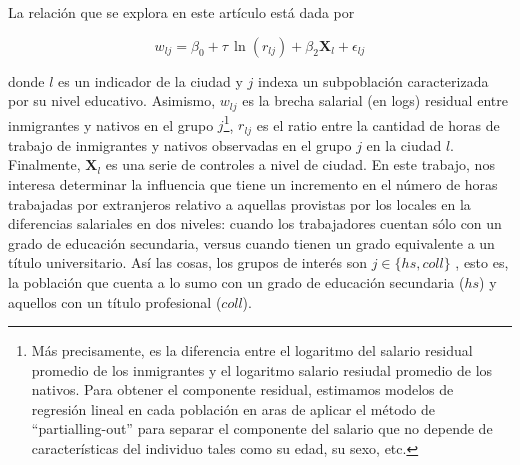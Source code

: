 \documentclass[a4paper, answers, addpoints, 11pt]{exam}
\begin{document}
La relación que se explora en este artículo está dada por

$$w_{lj}=\beta_0+\tau \, \ln (r_{lj})+\beta_2 \boldsymbol{X}_l+\epsilon_{lj}$$

donde $l$ es un indicador de la ciudad y $j$ indexa un subpoblación caracterizada por su nivel educativo. Asimismo, $w_{lj}$ es la brecha salarial (en logs) residual entre inmigrantes y nativos en el grupo $j$\footnote{ Más precisamente, es la diferencia entre el logaritmo del salario residual promedio de los inmigrantes y el logaritmo salario resiudal promedio de los nativos. Para obtener el componente residual, estimamos modelos de regresión lineal en cada población en aras de aplicar el método de ``partialling-out'' para separar el componente del salario que no depende de características del individuo tales como su edad, su sexo, etc.}, $r_{lj}$ es el ratio entre la cantidad de horas de trabajo de inmigrantes y nativos  observadas en el grupo $j$ en la ciudad $l$. Finalmente, $\boldsymbol{X}_l$ es una serie de controles a nivel de ciudad. En este trabajo, nos interesa determinar la influencia que tiene un incremento en el número de horas trabajadas por extranjeros relativo a aquellas provistas por los locales en la diferencias salariales en dos niveles: cuando los trabajadores cuentan sólo con un grado de educación secundaria, versus cuando tienen un grado equivalente a un título universitario. Así las cosas, los grupos de interés son $j \in \{hs,coll\}$ , esto es, la población que cuenta a lo sumo con un grado de educación secundaria ($hs$) y aquellos con un título profesional ($coll$).\\
\end{document}
